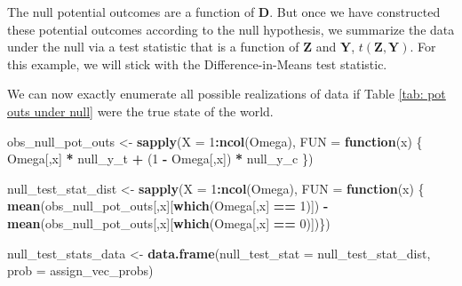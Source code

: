 \documentclass[12pt,leqno]{article}
\newenvironment{Shaded}{\begin{snugshade}}{\end{snugshade}}
\newcommand{\ControlFlowTok}[1]{\textcolor[rgb]{0.13,0.29,0.53}{\textbf{#1}}}
\newcommand{\DataTypeTok}[1]{\textcolor[rgb]{0.13,0.29,0.53}{#1}}
\newcommand{\DecValTok}[1]{\textcolor[rgb]{0.00,0.00,0.81}{#1}}
\newcommand{\KeywordTok}[1]{\textcolor[rgb]{0.13,0.29,0.53}{\textbf{#1}}}
\newcommand{\NormalTok}[1]{#1}
\newcommand{\OperatorTok}[1]{\textcolor[rgb]{0.81,0.36,0.00}{\textbf{#1}}}
\newcommand{\StringTok}[1]{\textcolor[rgb]{0.31,0.60,0.02}{#1}}
\theoremstyle{newstyle}
\begin{document}
The null potential outcomes are a function of \(\mathbf{D}\). But once
we have constructed these potential outcomes according to the null
hypothesis, we summarize the data under the null via a test statistic
that is a function of \(\mathbf{Z}\) and \(\mathbf{Y}\),
\(t\left(\mathbf{Z}, \mathbf{Y}\right)\). For this example, we will
stick with the Difference-in-Means test statistic.

We can now exactly enumerate all possible realizations of data if Table
\ref{tab: pot outs under null} were the true state of the world.

\begin{Shaded}
\begin{Highlighting}[]
\NormalTok{obs_null_pot_outs <-}\StringTok{ }\KeywordTok{sapply}\NormalTok{(}\DataTypeTok{X =} \DecValTok{1}\OperatorTok{:}\KeywordTok{ncol}\NormalTok{(Omega),}
                            \DataTypeTok{FUN =} \ControlFlowTok{function}\NormalTok{(x) \{ Omega[,x] }\OperatorTok{*}\StringTok{ }\NormalTok{null_y_t }\OperatorTok{+}\StringTok{ }\NormalTok{(}\DecValTok{1} \OperatorTok{-}\StringTok{ }\NormalTok{Omega[,x]) }\OperatorTok{*}\StringTok{ }\NormalTok{null_y_c \})}

\NormalTok{null_test_stat_dist <-}\StringTok{ }\KeywordTok{sapply}\NormalTok{(}\DataTypeTok{X =} \DecValTok{1}\OperatorTok{:}\KeywordTok{ncol}\NormalTok{(Omega),}
                              \DataTypeTok{FUN =} \ControlFlowTok{function}\NormalTok{(x) \{ }\KeywordTok{mean}\NormalTok{(obs_null_pot_outs[,x][}\KeywordTok{which}\NormalTok{(Omega[,x] }\OperatorTok{==}\StringTok{ }\DecValTok{1}\NormalTok{)]) }\OperatorTok{-}
\StringTok{                                  }\KeywordTok{mean}\NormalTok{(obs_null_pot_outs[,x][}\KeywordTok{which}\NormalTok{(Omega[,x] }\OperatorTok{==}\StringTok{ }\DecValTok{0}\NormalTok{)])\})}

\NormalTok{null_test_stats_data <-}\StringTok{ }\KeywordTok{data.frame}\NormalTok{(}\DataTypeTok{null_test_stat =}\NormalTok{ null_test_stat_dist,}
                                   \DataTypeTok{prob =}\NormalTok{ assign_vec_probs)}
\end{Highlighting}
\end{Shaded}
\end{document}
